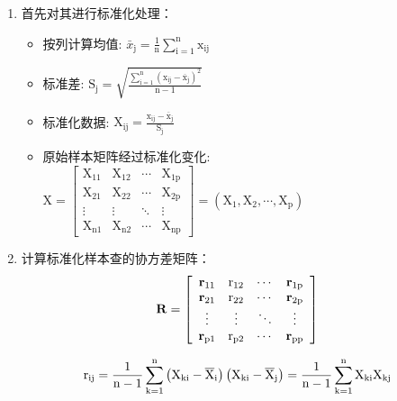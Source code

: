 \documentclass {article}
\begin{document}
	\begin{enumerate}
		\item 首先对其进行标准化处理：
		\begin{itemize}
			\item 按列计算均值: 
			$\bar{x}_{\mathrm{j}}=\frac{1}{\mathrm{n}} \sum_{\mathrm{i}=1}^{\mathrm{n}} \mathrm{x}_{\mathrm{ij}}$
			
			\item 标准差: $\mathrm{S}_{\mathrm{j}}=\sqrt{\frac{\sum_{\mathrm{i}=1}^{\mathrm{n}}\left(\mathrm{x}_{\mathrm{ij}}-\overline{\mathrm{x}}_{\mathrm{j}}\right)^2}{\mathrm{n}-1}}$
			
			\item 标准化数据: $\mathrm{X}_{\mathrm{ij}}=\frac{\mathrm{x}_{\mathrm{ij}}-\overline{\mathrm{x}}_{\mathrm{j}}}{\mathrm{S}_{\mathrm{j}}}$
			
			\item 原始样本矩阵经过标准化变化: \\
			$\mathrm{X}=\left[\begin{array}{cccc}\mathrm{X}_{11} & \mathrm{X}_{12} & \cdots & \mathrm{X}_{1 \mathrm{p}} \\ \mathrm{X}_{21} & \mathrm{X}_{22} & \cdots & \mathrm{X}_{2 \mathrm{p}} \\ \vdots & \vdots & \ddots & \vdots \\ \mathrm{X}_{\mathrm{n} 1} & \mathrm{X}_{\mathrm{n} 2} & \cdots & \mathrm{X}_{\mathrm{np}}\end{array}\right]=\left(\mathrm{X}_1, \mathrm{X}_2, \cdots, \mathrm{X}_{\mathrm{p}}\right)$
		\end{itemize}
		
		
		\item 计算标准化样本查的协方差矩阵：
		\begin{equation}
			\centering
			\mathbf{R}=\left[\begin{array}{cccc}
				\mathbf{r}_{11} & \mathrm{r}_{12} & \cdots & \mathbf{r}_{1 \mathrm{p}} \\
				\mathbf{r}_{21} & \mathrm{r}_{22} & \cdots & \mathbf{r}_{2 \mathrm{p}} \\
				\vdots & \vdots & \ddots & \vdots \\
				\mathbf{r}_{\mathrm{p} 1} & \mathrm{r}_{\mathrm{p} 2} & \cdots & \mathbf{r}_{\mathrm{pp}}
			\end{array}\right]
		\end{equation}
		
		\begin{equation}
			\centering
			\mathrm{r}_{\mathrm{ij}}=\frac{1}{\mathrm{n}-1} \sum_{\mathrm{k}=1}^{\mathrm{n}}\left(\mathrm{X}_{\mathrm{ki}}-\overline{\mathrm{X}}_{\mathrm{i}}\right)\left(\mathrm{X}_{\mathrm{ki}}-\overline{\mathrm{X}}_{\mathrm{j}}\right)=\frac{1}{\mathrm{n}-1} \sum_{\mathrm{k}=1}^{\mathrm{n}} \mathrm{X}_{\mathrm{ki}} \mathrm{X}_{\mathrm{kj}}
		\end{equation}
		

\end{enumerate}
\end{document}
